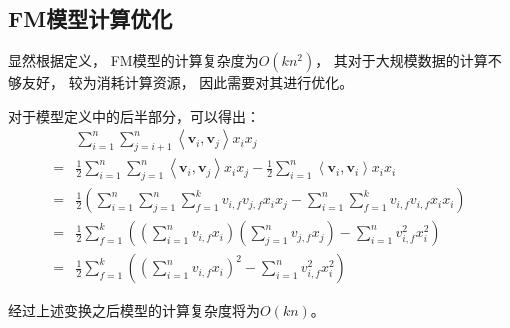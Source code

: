\subsection{FM模型计算优化}

显然根据定义，
FM模型的计算复杂度为$O(kn^2)$，
其对于大规模数据的计算不够友好，
较为消耗计算资源，
因此需要对其进行优化。

对于模型定义中的后半部分，可以得出：
\begin{equation}
    \begin{aligned}
          & \sum_{i=1}^{n} \sum_{j=i+1}^{n}\left\langle\mathbf{v}_{i}, \mathbf{v}_{j}\right\rangle x_{i} x_{j}                                                                                                         \\
        = & \frac{1}{2} \sum_{i=1}^{n} \sum_{j=1}^{n}\left\langle\mathbf{v}_{i}, \mathbf{v}_{j}\right\rangle x_{i} x_{j}-\frac{1}{2} \sum_{i=1}^{n}\left\langle\mathbf{v}_{i}, \mathbf{v}_{i}\right\rangle x_{i} x_{i} \\
        = & \frac{1}{2}\left(\sum_{i=1}^{n} \sum_{j=1}^{n} \sum_{f=1}^{k} v_{i, f} v_{j, f} x_{i} x_{j}-\sum_{i=1}^{n} \sum_{f=1}^{k} v_{i, f} v_{i, f} x_{i} x_{i}\right)                                             \\
        = & \frac{1}{2} \sum_{f=1}^{k}\left(\left(\sum_{i=1}^{n} v_{i, f} x_{i}\right)\left(\sum_{j=1}^{n} v_{j, f} x_{j}\right)-\sum_{i=1}^{n} v_{i, f}^{2} x_{i}^{2}\right)                                          \\
        = & \frac{1}{2} \sum_{f=1}^{k}\left(\left(\sum_{i=1}^{n} v_{i, f} x_{i}\right)^{2}-\sum_{i=1}^{n} v_{i, f}^{2} x_{i}^{2}\right)
    \end{aligned}
\end{equation}

经过上述变换之后模型的计算复杂度将为$O(kn)$。